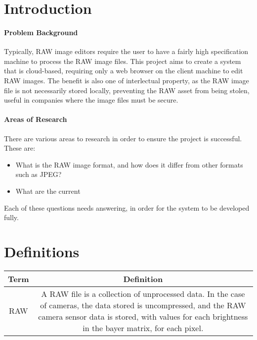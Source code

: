 \documentclass[14pt]{article}
\begin{document}
\maketitle


\section{Introduction}
\paragraph{Problem Background}
Typically, RAW image editors require the user to have a fairly high specification machine
to process the RAW image files. This project aims to create a system that is cloud-based,
requiring only a web browser on the client machine to edit RAW images. The benefit is also
one of interlectual property, as the RAW image file is not necessarily stored locally,
preventing the RAW asset from being stolen, useful in companies where the image files must
be secure.

\paragraph{Areas of Research}
There are various areas to research in order to ensure the project is successful. These are:

\begin{itemize}
  \item What is the RAW image format, and how does it differ from other formats such as JPEG?
  \item What are the current 
\end{itemize}

Each of these questions needs answering, in order for the system to be developed fully.

\section{Definitions}
\begin{tabular}{| c | c |}
    Term & Definition \\
    \hline
    RAW & A RAW file is a collection of unprocessed data. In the case of cameras, the data stored
          is uncompressed, and the RAW camera sensor data is stored, with values for each brightness in the bayer matrix, for each pixel.
\end{tabular}
\end{document}
